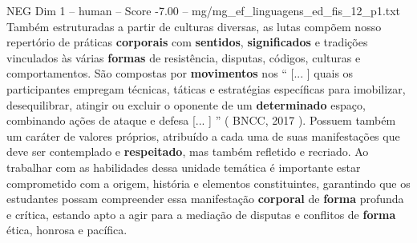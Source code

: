 \begin{textsample}{NEG Dim 1 – human – Score -7.00 – mg/mg\_ef\_linguagens\_ed\_fis\_12\_p1.txt}  \label{ex:f1_neg_004}
Também estruturadas a partir de culturas diversas, as lutas compõem nosso repertório de práticas \textbf{corporais} com \textbf{sentidos}, \textbf{significados} e tradições vinculados às várias \textbf{formas} de resistência, disputas, códigos, culturas e comportamentos.
São compostas por \textbf{movimentos} nos “ [... ] quais os participantes empregam técnicas, táticas e estratégias específicas para imobilizar, desequilibrar, atingir ou excluir o oponente de um \textbf{determinado} espaço, combinando ações de ataque e defesa [... ] ” ( BNCC, 2017 ).
Possuem também um caráter de valores próprios, atribuído a cada uma de suas manifestações que deve ser contemplado e \textbf{respeitado}, mas também refletido e recriado.
Ao trabalhar com as habilidades dessa unidade temática é importante estar comprometido com a origem, história e elementos constituintes, garantindo que os estudantes possam compreender essa manifestação \textbf{corporal} de \textbf{forma} profunda e crítica, estando apto a agir para a mediação de disputas e conflitos de \textbf{forma} ética, honrosa e pacífica.

\end{textsample}
